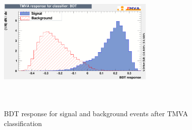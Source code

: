\begin{figure}
  \centering
  \includegraphics[width=0.68\textwidth,height=7cm,keepaspectratio]{HiggsAnalysis/figures/bdt}
  \caption[Classifier BDT response]{BDT response for signal and background events after TMVA classification}
  \label{bdt}
\end{figure}

